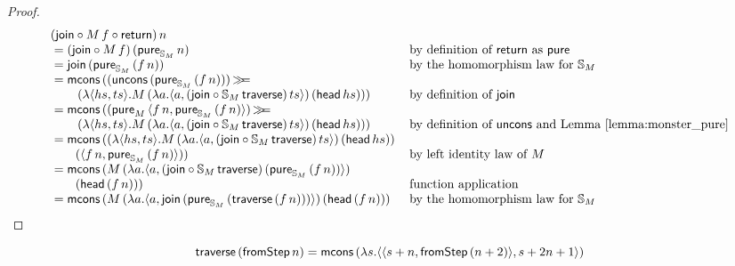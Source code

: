\documentclass{article}
\newenvironment{lemma}[1]{%
  \renewcommand\thelemmainner{#1}%
  \lemmainner
}{\endlemmainner}
\begin{document}
\begin{proof}
$$
\begin{array}{ll}
(\join \comp  M\, f \comp \return)\, n \\
{}= (\join \comp  M\, f)\, (\apure_{\stream{M}}\, n)
  & \mbox{by definition of } \return \mbox{ as } \apure \\
{}= \join\, (\apure_{\stream{M}}\, (f \,n))
  & \mbox{by the homomorphism law for } \stream{M}\\
{}= \mcons\, ((\uncons\, (\apure_{\stream{M}}\, (f\, n)))\, \bind \\\qquad \,(\lambda \pair{hs}{ts} . M\,(\lambda a . \pair{a}{(\join \comp \stream{M}\,\mathsf{traverse})\, ts})\, (\head\, hs)))
  & \mbox{by definition of } \join \\
{}= \mcons\,((\apure_{M}\,\pair{f\, n}{\apure_{\stream{M}}\,(f\, n)})\, \bind \\\qquad \,(\lambda \pair{hs}{ts} . M\,(\lambda a . \pair{a}{(\join \comp \stream{M}\, \mathsf{traverse})\, ts})\, (\head\, hs)))
  & \mbox{by definition of } \uncons \mbox{ and Lemma \ref{lemma:monster_pure}}\\
{}= \mcons\, ((\lambda \pair{hs}{ts} . M\,(\lambda a . \pair{a}{(\join \comp \stream{M}\,\mathsf{traverse})\, ts})\, (\head\, hs)) \, \\\qquad (\pair{f\, n}{\apure_{\stream{M}}\,(f\, n)}))
  & \mbox{by left identity law of } M \\
{}= \mcons\,(M\,(\lambda a . \pair{a}{(\join \comp \stream{M}\,\mathsf{traverse})\, (\apure_{\stream{M}}\,(f\, n))})\, \\ \qquad (\head\, (f\, n)))
 & \mbox{function application} \\
 {}= \mcons\, (M\,(\lambda a . \pair{a}{\join\, (\apure_{\stream{M}}\, (\mathsf{traverse}\, (f\, n)))})\, (\head\, (f\, n)))
 & \mbox{by the homomorphism law for } \stream{M}\\

\end{array} 
$$
\end{proof}


\begin{lemma}{19}\label{lemma:traverse_fromstepstr}
$$
\mathsf{traverse}\, (\mathsf{fromStep}\, n) = \mathsf{mcons}\, (\lambda s . \langle \langle s+n, \mathsf{fromStep}\, (n + 2) \rangle, s + 2n + 1 \rangle)
$$
\end{lemma} 
\end{document}
